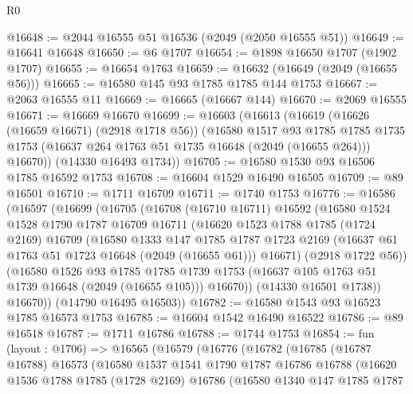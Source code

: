 \begin{lexlean}{R0}
\begin{coremodule}
@16648 := @2044 @16555 @51 @16536 (@2049 (@2050 @16555 @51))
@16649 := @16641 @16648
@16650 := @6 @1707
@16654 := @1898 @16650 @1707 (@1902 @1707)
@16655 := @16654 @1763
@16659 := @16632 (@16649 (@2049 (@16655 @56)))
@16665 := @16580 @145 @93 @1785 @1785 @144 @1753
@16667 := @2063 @16555 @11
@16669 := @16665 (@16667 @144)
@16670 := @2069 @16555
@16671 := @16669 @16670
@16699 := @16603
    (@16613
      (@16619
        (@16626 (@16659 @16671) (@2918 @1718 @56))
        (@16580
          @1517
          @93
          @1785
          @1785
          @1735
          @1753
          (@16637 @264 @1763 @51 @1735 @16648 (@2049 (@16655 @264)))
          @16670))
      (@14330 @16493 @1734))
@16705 := @16580 @1530 @93 @16506 @1785 @16592 @1753
@16708 := @16604 @1529 @16490 @16505
@16709 := @89 @16501
@16710 := @1711 @16709
@16711 := @1740 @1753
@16776 := @16586
    (@16597
      (@16699
        (@16705
          (@16708
            (@16710 @16711)
            @16592
            (@16580
              @1524
              @1528
              @1790
              @1787
              @16709
              @16711
              (@16620
                @1523
                @1788
                @1785
                (@1724 @2169)
                @16709
                (@16580
                  @1333
                  @147
                  @1785
                  @1787
                  @1723
                  @2169
                  (@16637 @61 @1763 @51 @1723 @16648 (@2049 (@16655 @61)))
                  @16671)
                (@2918 @1722 @56))
              (@16580
                @1526
                @93
                @1785
                @1785
                @1739
                @1753
                (@16637 @105 @1763 @51 @1739 @16648 (@2049 (@16655 @105)))
                @16670))
            (@14330 @16501 @1738))
          @16670))
      (@14790 @16495 @16503))
@16782 := @16580 @1543 @93 @16523 @1785 @16573 @1753
@16785 := @16604 @1542 @16490 @16522
@16786 := @89 @16518
@16787 := @1711 @16786
@16788 := @1744 @1753
@16854 := fun (layout : @1706) =>
  @16565
    (@16579
      (@16776
        (@16782
          (@16785
            (@16787 @16788)
            @16573
            (@16580
              @1537
              @1541
              @1790
              @1787
              @16786
              @16788
              (@16620
                @1536
                @1788
                @1785
                (@1728 @2169)
                @16786
                (@16580
                  @1340
                  @147
                  @1785
                  @1787

\end{coremodule}
\end{lexlean}
